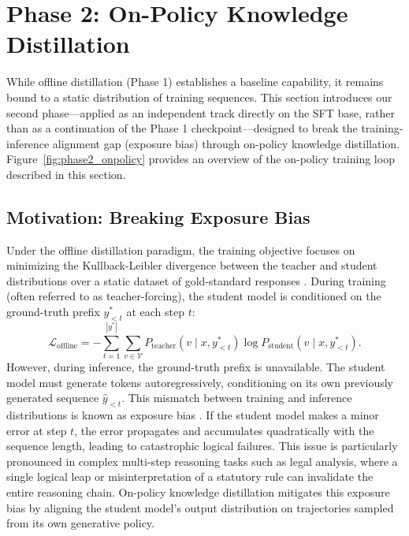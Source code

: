 \section{Phase 2: On-Policy Knowledge Distillation}

While offline distillation (Phase 1) establishes a baseline capability, it remains bound to a static distribution of training sequences. This section introduces our second phase---applied as an independent track directly on the SFT base, rather than as a continuation of the Phase 1 checkpoint---designed to break the training-inference alignment gap (exposure bias) through on-policy knowledge distillation. Figure~\ref{fig:phase2_onpolicy} provides an overview of the on-policy training loop described in this section.



\subsection{Motivation: Breaking Exposure Bias}

Under the offline distillation paradigm, the training objective focuses on minimizing the Kullback-Leibler divergence between the teacher and student distributions over a static dataset of gold-standard responses \parencite{hinton2015distillingknowledgeneuralnetwork,sanh2020distilbertdistilledversionbert}. During training (often referred to as teacher-forcing), the student model is conditioned on the ground-truth prefix $y_{<t}^*$ at each step $t$:
\begin{equation}
    \mathcal{L}_{\text{offline}} = - \sum_{t=1}^{|y^*|} \sum_{v \in \mathcal{V}} P_{\text{teacher}}(v \mid x, y_{<t}^*) \log P_{\text{student}}(v \mid x, y_{<t}^*).
\end{equation}
However, during inference, the ground-truth prefix is unavailable. The student model must generate tokens autoregressively, conditioning on its own previously generated sequence $\hat{y}_{<t}$. This mismatch between training and inference distributions is known as exposure bias \parencite{agarwal2024onpolicydistillationlanguagemodels,song2026surveyonpolicydistillationlarge}. If the student model makes a minor error at step $t$, the error propagates and accumulates quadratically with the sequence length, leading to catastrophic logical failures. This issue is particularly pronounced in complex multi-step reasoning tasks such as legal analysis, where a single logical leap or misinterpretation of a statutory rule can invalidate the entire reasoning chain. On-policy knowledge distillation mitigates this exposure bias by aligning the student model's output distribution on trajectories sampled from its own generative policy.

